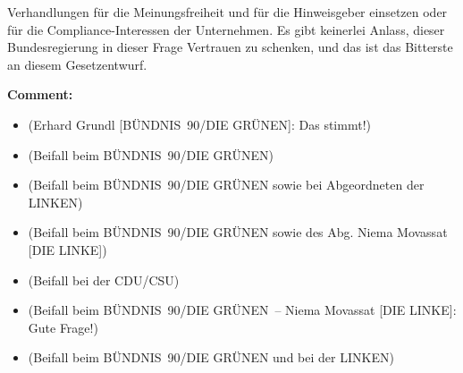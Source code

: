 \documentclass{article}
\begin{document}
Verhandlungen für die Meinungsfreiheit und für die Hinweisgeber einsetzen oder für die Compliance-Interessen der Unternehmen. Es gibt keinerlei Anlass, dieser Bundesregierung in dieser Frage Vertrauen zu schenken, und das ist das Bitterste an diesem Gesetzentwurf.  

\noindent\textbf{Comment:}
\begin{itemize}
    \setlength\itemsep{-3pt}
    \item (Erhard Grundl [BÜNDNIS 90/DIE GRÜNEN]: Das stimmt!)
    \setlength\itemsep{-3pt}
    \item (Beifall beim BÜNDNIS 90/DIE GRÜNEN)
    \setlength\itemsep{-3pt}
    \item (Beifall beim BÜNDNIS 90/DIE GRÜNEN sowie bei Abgeordneten der LINKEN)
    \setlength\itemsep{-3pt}
    \item (Beifall beim BÜNDNIS 90/DIE GRÜNEN sowie des Abg. Niema Movassat [DIE LINKE])
    \setlength\itemsep{-3pt}
    \item (Beifall bei der CDU/CSU)
    \setlength\itemsep{-3pt}
    \item (Beifall beim BÜNDNIS 90/DIE GRÜNEN – Niema Movassat [DIE LINKE]: Gute Frage!)
    \setlength\itemsep{-3pt}
    \item (Beifall beim BÜNDNIS 90/DIE GRÜNEN und bei der LINKEN)
\end{itemize}
\end{document}
